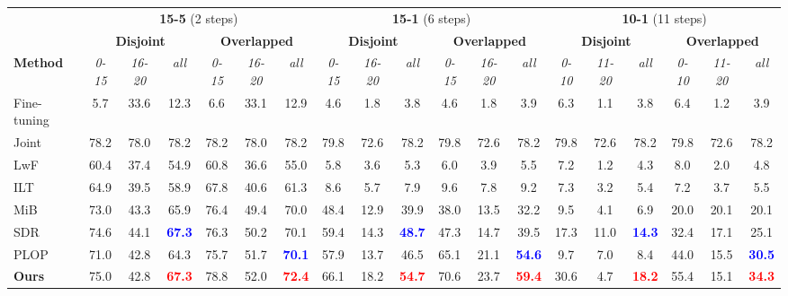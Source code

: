 \documentclass[10pt,twocolumn,letterpaper]{article}
\begin{document}
\newcommand{\major}[1]{\textcolor{blue}{#1}}
\begin{table*}[!htp]
\centering
\setlength{\tabcolsep}{3pt} \small

\begin{tabular}{l||cc|c||cc|c||cc|c||cc|c||cc|c||cc|c}
\toprule
\multicolumn{1}{c}{}   & \multicolumn{6}{c}{{\textbf{15-5} (2 steps)}} & \multicolumn{6}{c}{{\textbf{15-1} (6 steps)}} & \multicolumn{6}{c}{{\textbf{10-1} (11 steps)}} \\
\multicolumn{1}{c||}{}    & \multicolumn{3}{c||}{\bf{Disjoint}}        & \multicolumn{3}{c||}{\bf{Overlapped}}  & \multicolumn{3}{c||}{\bf{Disjoint}}     & \multicolumn{3}{c||}{\bf{Overlapped}}  & \multicolumn{3}{c||}{\textbf{Disjoint}}      & \multicolumn{3}{c}{\textbf{Overlapped}} \\
\bf{Method} & \it{0-15}  & \it{16-20}   & \it{all}   & \it{0-15}  & \it{16-20}   & \it{all} & \it{0-15}  & \it{16-20}   & \it{all}  & \it{0-15}  & \it{16-20}   & \it{all} & \it{0-10} & \it{11-20} & \it{all} & \it{0-10} & \it{11-20} & \it{all}     \\ \hline
{Fine-tuning }     &  5.7    & 33.6    & 12.3      & 6.6  & 33.1  & 12.9    & 4.6  & 1.8  & 3.8  & 4.6        & 1.8   & 3.9 & 6.3 & 1.1 & 3.8 & 6.4 & 1.2 & 3.9      \\
{Joint} & 78.2&	78.0& 78.2	&	78.2&	78.0&	78.2&	79.8&	72.6&	78.2&	79.8&	72.6&	78.2 & 79.8       & 72.6       & 78.2       & 79.8       & 72.6       & 78.2 \\
\hline \hline
{LwF \cite{li2017learning} }    & 60.4  & 37.4 & 54.9 & 60.8  & 36.6  & 55.0  & 5.8 & 3.6 & 5.3 & 6.0 & 3.9 & 5.5 & 7.2 & 1.2 & 4.3 & 8.0 & 2.0 & 4.8 \\
{ILT \cite{ilt}}    & 64.9 & 39.5 & 58.9 & 67.8 & 40.6 & 61.3 & 8.6 & 5.7  & 7.9  & 9.6  & 7.8  & 9.2 & 7.3 & 3.2 & 5.4 & 7.2 & 3.7 & 5.5 \\
MiB~\cite{mib}   & 73.0  & 43.3    & 65.9  & 76.4   & 49.4  & 70.0  & 48.4   & 12.9   & 39.9    & 38.0   & 13.5       & 32.2 & 9.5 & 4.1 & 6.9 & 20.0 & 20.1 & 20.1    \\
SDR~\cite{sdr}& 74.6 & 44.1 & \textcolor{blue}{\bf{67.3}} & 76.3 & 50.2 & 70.1 & 59.4 & 14.3 & \textcolor{blue}{\bf{48.7}} & 47.3 & 14.7 & 39.5 & 17.3 & 11.0 & \textcolor{blue}{\bf{14.3}} & 32.4 & 17.1 & 25.1\\
PLOP~\cite{plop} & 71.0 & 42.8 & 64.3 & 75.7 & 51.7 & \textcolor{blue}{\bf{70.1}} &57.9 & 13.7 & 46.5 & 65.1 & 21.1 & \textcolor{blue}{\bf{54.6}} & 9.7 & 7.0 & 8.4 & 44.0 & 15.5 & \textcolor{blue}{\bf{30.5}} \\
\bf{Ours} & 75.0 & 42.8 & \textcolor{red}{\bf{67.3}} & 78.8 & 52.0 & \textcolor{red}{\bf{72.4}} & 66.1 & 18.2 & \textcolor{red}{\bf{54.7}} & 70.6 & 23.7 & \textcolor{red}{\bf{59.4}} & 30.6 & 4.7 & \textcolor{red}{\bf{18.2}} & 55.4 & 15.1 & \textcolor{red}{\bf{34.3}}\\


\end{tabular}
\end{table*}
\end{document}
